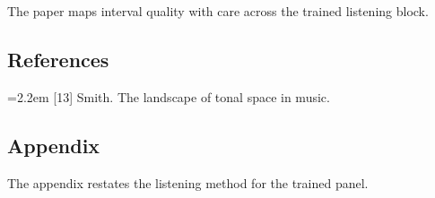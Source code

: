 \documentclass{article}
\begin{document}
The paper maps interval quality with care across the trained listening block.
\subsection{References}\label{references}
\hangindent=2.2em [13] Smith. The landscape of tonal space in music.
\subsection{Appendix}\label{appendix}
The appendix restates the listening method for the trained panel.
\end{document}
